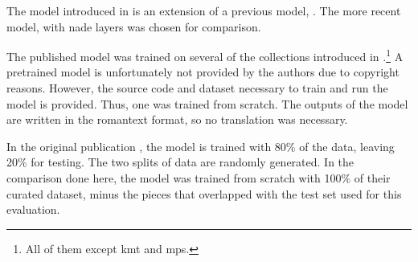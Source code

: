 
The model introduced in \textcite{micchi2021deep} is an
extension of a previous model, \textcite{micchi2020not}. The
more recent model, with \gls{nade} layers was chosen for
comparison.

The published model was trained on several of the
collections introduced in
.\footnote{All of
them except \gls{kmt} and \gls{mps}.} A pretrained model is
unfortunately not provided by the authors due to copyright
reasons. However, the source code and dataset necessary to
train and run the model is provided. Thus, one was trained
from scratch. The outputs of the model are written in the
\gls{romantext} format, so no translation was necessary. 

In the original publication \parencite{micchi2021deep}, the
model is trained with 80\% of the data, leaving 20\% for
testing. The two splits of data are randomly generated. In
the comparison done here, the model was trained from scratch
with 100\% of their curated dataset, minus the pieces that
overlapped with the test set used for this evaluation.
